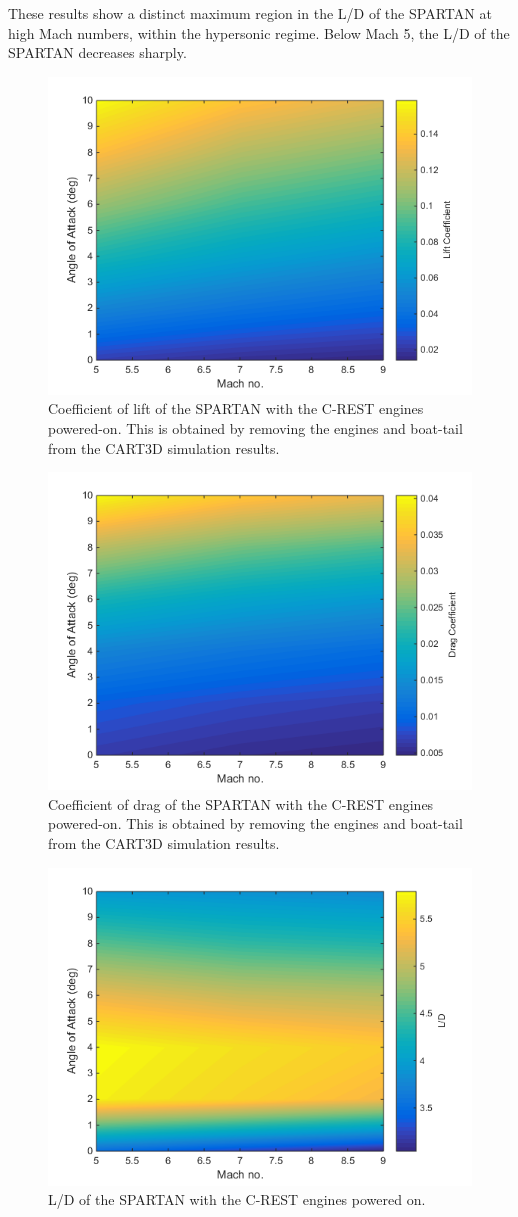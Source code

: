 These results show a distinct maximum region in the L/D of the SPARTAN at high Mach numbers, within the hypersonic regime. Below Mach 5, the L/D of the SPARTAN decreases sharply. 

\begin{figure}
	\centering
	\includegraphics[width=0.7\linewidth]{figures/3_vehicle_design/Cl-EngineOn}
	\caption{Coefficient of lift of the SPARTAN with the C-REST engines powered-on. This is obtained by removing the engines and boat-tail from the CART3D simulation results.}
	\label{fig:Cl-EngineOn}
\end{figure}
\begin{figure}
	\centering
	\includegraphics[width=0.7\linewidth]{figures/3_vehicle_design/Cd-EngineOn}
	\caption{Coefficient of drag of the SPARTAN with the C-REST engines powered-on. This is obtained by removing the engines and boat-tail from the CART3D simulation results.}
	\label{fig:Cd-EngineOn}
\end{figure}
\begin{figure}
	\centering
	\includegraphics[width=0.7\linewidth]{figures/3_vehicle_design/LD-EngineOn}
	\caption{L/D of the SPARTAN with the C-REST engines powered on.}
	\label{fig:LD-EngineOn}
\end{figure}

